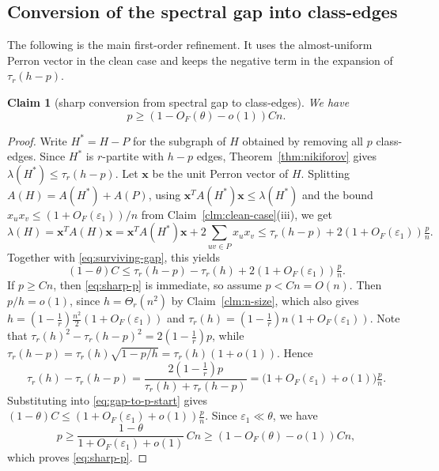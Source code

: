 \documentclass[11pt,a4paper]{article}
\newtheorem{claim}[theorem]{Claim}
\theoremstyle{definition}
\theoremstyle{plain}
\newcommand{\eps}{\varepsilon}
\renewcommand{\le}{\leqslant}
\renewcommand{\ge}{\geqslant}
\begin{document}
\subsection{Conversion of the spectral gap into class-edges}

The following is the main first-order refinement.  
It uses the almost-uniform Perron vector in the clean case and keeps the negative term in the expansion of $\tau_r(h-p)$.

\begin{claim}[sharp conversion from spectral gap to class-edges]\label{clm:sharp-class-edges}
We have 
\begin{equation}\label{eq:sharp-p}
  p\ge (1-O_F(\theta)-o(1))Cn.
\end{equation}
\end{claim}

\begin{proof}
Write $H^*=H-P$ for the subgraph of $H$ obtained by removing all $p$ class-edges.  Since $H^*$ is $r$-partite with $h-p$ edges, Theorem~\ref{thm:nikiforov} gives $\lambda(H^*)\le\tau_r(h-p)$.  Let $\bm{x}$ be the unit Perron vector of $H$.  Splitting $A(H)=A(H^*)+A(P)$, using $\bm{x}^{T}A(H^*)\bm{x}\le\lambda(H^*)$ and the bound $x_ux_v\le(1+O_F(\eps_1))/n$ from Claim~\ref{clm:clean-case}(iii), 
we get 
\[
  \lambda(H)=\bm{x}^{T}A(H)\bm{x}
  =\bm{x}^{T}A(H^*)\bm{x}+2\!\sum_{uv\in P}x_ux_v
  \le\tau_r(h-p)+2(1+O_F(\eps_1))\tfrac pn.
\]
Together with \eqref{eq:surviving-gap}, this yields
\begin{equation}\label{eq:gap-to-p-start}
  (1-\theta)C\le\tau_r(h-p)-\tau_r(h)+2(1+O_F(\eps_1))\tfrac pn.
\end{equation}
If $p\ge Cn$, then \eqref{eq:sharp-p} is immediate, so assume $p<Cn=O(n)$.  Then $p/h=o(1)$, since $h=\Theta_r(n^2)$ by Claim~\ref{clm:n-size}, which also gives $h=(1-\frac{1}{r}) \frac{n^2}{2} (1+O_F(\eps_1))$ and  $\tau_r(h)=(1-\tfrac1r)n(1+O_F(\eps_1))$.  Note that $\tau_r(h)^2-\tau_r(h-p)^2=2(1-\tfrac1r)p$, while $\tau_r(h-p)=\tau_r(h)\sqrt{1-p/h}=\tau_r(h)(1+o(1))$. Hence
\[
  \tau_r(h)-\tau_r(h-p)
  =\frac{2(1-\tfrac1r)p}{\tau_r(h)+\tau_r(h-p)}
  =\big(1+O_F(\eps_1)+o(1)\big)\tfrac pn.
\]
Substituting into \eqref{eq:gap-to-p-start} gives $(1-\theta)C\le(1+O_F(\eps_1)+o(1))\tfrac pn$. 
Since $\eps_1\ll\theta$, we have 
\[
  p\ge\frac{1-\theta}{1+O_F(\eps_1)+o(1)}\,Cn\ge(1-O_F(\theta)-o(1))Cn,
\]
which proves \eqref{eq:sharp-p}.
\end{proof}
\end{document}
